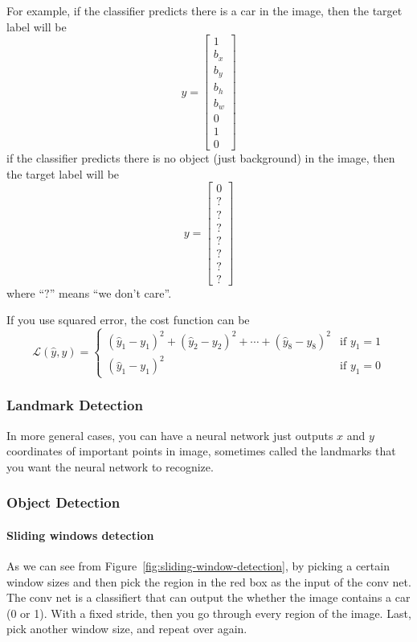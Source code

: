 \documentclass[UTF8]{article}
\newcommand{\Vector}[1]{\boldsymbol{\mathit{#1}}}   %
\newcommand{\Cal}[1]{\mathcal{#1}}                  %
\begin{document}
For example, if the classifier predicts there is a car in the image, then the target label will be
$$ \Vector{y} = \left[\begin{array}{c} 1 \\ b_x \\ b_y \\ b_h \\ b_w \\ 0 \\ 1 \\ 0
\end{array}\right] $$
if the classifier predicts there is no object (just background) in the image, then the target label
will be
$$ \Vector{y} = \left[\begin{array}{c} 0 \\ ? \\ ? \\ ? \\ ? \\ ? \\ ? \\ ? \end{array}\right] $$
where ``$?$'' means ``we don't care''.

If you use squared error, the cost function can be
$$ \Cal{L}(\hat{y}, y) = \left\{\begin{array}{ll} (\hat{y}_1 - y_1)^2 + (\hat{y}_2 - y_2)^2 + \cdots
+ (\hat{y}_8 - y_8)^2 & \text{if } y_1 = 1 \\ (\hat{y}_1 - y_1)^2 & \text{if } y_1 = 0 \end{array}
\right. $$

\subsubsection{Landmark Detection}
In more general cases, you can have a neural network just outputs $x$ and $y$ coordinates of
important points in image, sometimes called the landmarks that you want the neural network to
recognize.

\subsubsection{Object Detection}
\paragraph{Sliding windows detection}
As we can see from Figure~\ref{fig:sliding-window-detection}, by picking a certain window sizes and
then pick the region in the red box as the input of the conv net. The conv net is a classifiert that
can output the whether the image contains a car (0 or 1). With a fixed stride, then you go
through every region of the image. Last, pick another window size, and repeat over again.
\end{document}
